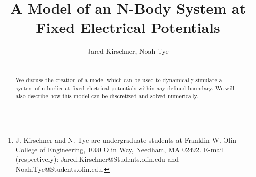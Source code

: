 \documentclass[journal]{IEEEtran}
\begin{document}
\newcommand{\norm}[1]{\mid#1\mid}
\newcommand{\del}[1]{\nabla#1}
\newcommand{\ddel}[1]{\nabla^2#1}

\title{A Model of an N-Body System at Fixed Electrical Potentials}
%
%
%

\author{Jared Kirschner, Noah Tye

\thanks{J. Kirschner and N. Tye are undergraduate students at Franklin W. Olin College of Engineering, 1000 Olin Way, Needham, MA 02492.  E-mail (respectively): Jared.Kirschner@Students.olin.edu and Noah.Tye@Students.olin.edu.}}

%




\maketitle

\begin{abstract}

We discuss the creation of a model which can be used to dynamically simulate a system of n-bodies at fixed electrical potentials within any defined boundary.  We will also describe how this model can be discretized and solved numerically.

\end{abstract}
\end{document}

